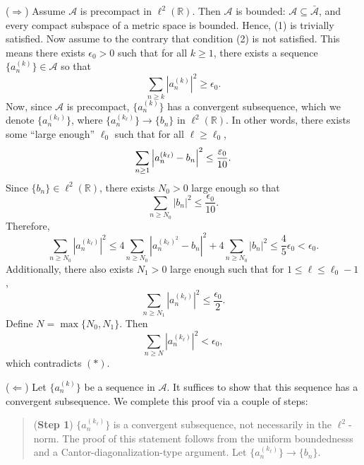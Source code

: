 \documentclass{article}
\begin{document}
\begin{itemize}
	\begin{solutions}
		($\Rightarrow$) Assume $\mathscr{A}$ is precompact in $\ell^{2}(\mathbb{R})$. Then $\mathscr{A}$ is bounded: $\mathscr{A} \subseteq \bar{\mathscr{A}}$, and every compact subspace of a metric space is bounded. Hence, (1) is trivially satisfied. Now assume to the contrary that condition (2) is not satisfied. This means there exists $\epsilon_{0} > 0$ such that for all $k\geq 1$, there exists a sequence $\{a_{n}^{(k)}\} \in \mathscr{A}$ so that 
			\begin{equation}
				\sum_{n\geq k}|a_{n}^{(k)}|^{2} \geq \epsilon_{0}. 
				\tag{\ast}
			\end{equation}
		Now, since $\mathscr{A}$ is precompact, $\{a_{n}^{(k)}\}$ has a convergent subsequence, which we denote $\{a_{n}^{(k_{\ell})}\}$, where $\{a_{n}^{(k_{\ell})}\} \to \{b_{n}\}$ in $\ell^{2}(\mathbb{R})$. In other words, there exists some ``large enough'' $\ell_{0}$ such that for all $\ell \geq \ell_{0}$, 
			\begin{equation}
				\sum_{n\geq 1}\left| a_{n}^{(k_{\ell})} - b_{n} \right|^{2} \leq \frac{\varepsilon_{0}}{10}. 
			\end{equation}
		Since $\{b_{n}\} \in \ell^{2}(\mathbb{R})$, there exists $N_{0} > 0$ large enough so that 
			\begin{equation}
				\sum_{n\geq N_{0}}|b_{n}|^{2} \leq \frac{\epsilon_{0}}{10}. 
			\end{equation}
		Therefore, 
			\begin{equation}
				\sum_{n\geq N_{0}}|a_{n}^{(k_{\ell})}|^{2} \leq 4\sum_{n \geq N_{0}}|a_{n}^{(k_{\ell})^{2}} - b_{n}|^{2} + 4\sum_{n\geq N_{0}}|b_{n}|^{2} \leq \frac{4}{5}\epsilon_{0} < \epsilon_{0}. 
			\end{equation}
		Additionally, there also exists $N_{1} > 0$ large enough such that for $1 \leq \ell \leq \ell_{0} - 1$, 
			\begin{equation}
				\sum_{n\geq N_{1}}|a_{n}^{(k_{\ell})}|^{2} \leq \frac{\epsilon_{0}}{2}. 
			\end{equation}
		Define $N = \max\{N_{0}, N_{1}\}$. Then 
			\begin{equation}
				\sum_{n\geq N}|a_{n}^{(k_{\ell})}|^{2} < \epsilon_{0}, 
			\end{equation}
		which contradicts $(\ast)$. 
		
		($\Leftarrow$) Let $\{a_{n}^{(k)}\}$ be a sequence in $\mathscr{A}$. It suffices to show that this sequence has a convergent subsequence. We complete this proof via a couple of steps: 
			\begin{quote}
				(\textbf{Step 1}) $\{a_{n}^{(k_{\ell})}\}$ is a convergent subsequence, not necessarily in the $\ell^{2}$-norm. The proof of this statement follows from the uniform boundednesss and a Cantor-diagonalization-type argument. Let $\{a_{n}^{(k_{\ell})}\} \to \{b_{n}\}$. 
				

\end{quote}
\end{solutions}
\end{itemize}
\end{document}
